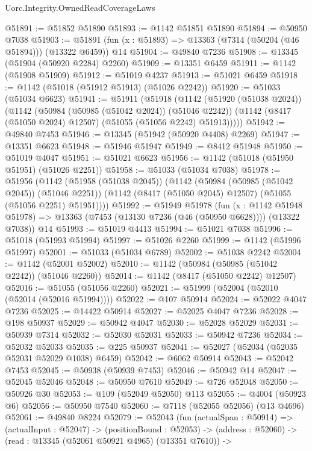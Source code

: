 \begin{lexlean}{Uorc.Integrity.OwnedReadCoverageLaws}
\begin{coremodule}
@51891 := @51852 @51890
@51893 := @1142 @51851 @51890
@51894 := @50950 @7038
@51903 := @51891 (fun (x : @51893) => @13363 (@7314 (@50204 (@46 @51894))) (@13322 @6459)) @14
@51904 := @49840 @7236
@51908 := @13345 (@51904 (@50920 @2284) @2260)
@51909 := @13351 @6459
@51911 := @1142 (@51908 @51909)
@51912 := @51019 @4237
@51913 := @51021 @6459
@51918 := @1142 (@51018 (@51912 @51913) (@51026 @2242))
@51920 := @51033 (@51034 @6623)
@51941 := @51911
    (@51918
      (@1142
        (@51920 (@51038 @2024))
        (@1142
          (@50984 (@50985 (@51042 @2024)) (@51046 @2242))
          (@1142 (@8417 (@51050 @2024) @12507) (@51055 (@51056 @2242) @51913)))))
@51942 := @49840 @7453
@51946 := @13345 (@51942 (@50920 @4408) @2269)
@51947 := @13351 @6623
@51948 := @51946 @51947
@51949 := @8412 @51948
@51950 := @51019 @4047
@51951 := @51021 @6623
@51956 := @1142 (@51018 (@51950 @51951) (@51026 @2251))
@51958 := @51033 (@51034 @7038)
@51978 := @51956
    (@1142
      (@51958 (@51038 @2045))
      (@1142
        (@50984 (@50985 (@51042 @2045)) (@51046 @2251))
        (@1142 (@8417 (@51050 @2045) @12507) (@51055 (@51056 @2251) @51951))))
@51992 := @51949
    @51978
    (fun (x : @1142 @51948 @51978) =>
    @13363 (@7453 (@13130 @7236 (@46 (@50950 @6628)))) (@13322 @7038))
    @14
@51993 := @51019 @4413
@51994 := @51021 @7038
@51996 := @51018 (@51993 @51994)
@51997 := @51026 @2260
@51999 := @1142 (@51996 @51997)
@52001 := @51033 (@51034 @6789)
@52002 := @51038 @2242
@52004 := @1142 (@52001 @52002)
@52010 := @1142 (@50984 (@50985 (@51042 @2242)) (@51046 @2260))
@52014 := @1142 (@8417 (@51050 @2242) @12507)
@52016 := @51055 (@51056 @2260)
@52021 := @51999 (@52004 (@52010 (@52014 (@52016 @51994))))
@52022 := @107 @50914
@52024 := @52022 @4047 @7236
@52025 := @14422 @50914
@52027 := @52025 @4047 @7236
@52028 := @198 @50937
@52029 := @50942 @4047
@52030 := @52028 @52029
@52031 := @50939 @7314
@52032 := @52030 @52031
@52033 := @50942 @7236
@52034 := @52032 @52033
@52035 := @225 @50937
@52041 := @52027 (@52034 (@52035 @52031 @52029 @1038) @6459)
@52042 := @6062 @50914
@52043 := @52042 @7453
@52045 := @50938 (@50939 @7453)
@52046 := @50942 @14
@52047 := @52045 @52046
@52048 := @50950 @7610
@52049 := @726 @52048
@52050 := @50926 @30
@52053 := @109 (@52049 @52050) @113
@52055 := @4004 (@50923 @6)
@52056 := @50950 @7540
@52060 := @7118 (@52055 @52056) (@13 @4696)
@52061 := @49840 @8224
@52079 := @52043
    (fun (actualSpan : @50914) =>
    (actualInput : @52047) ->
    (positionBound : @52053) ->
    (address : @52060) ->
    (read : @13345 (@52061 @50921 @4965) (@13351 @7610)) ->

\end{coremodule}
\end{lexlean}
